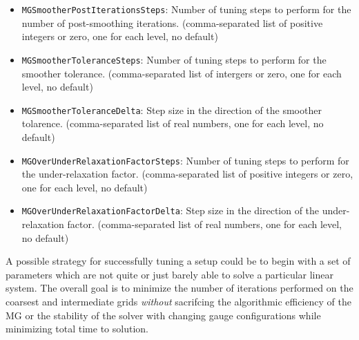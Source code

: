 \begin{itemize}
  \item \texttt{MGSmootherPostIterationsSteps}: Number of tuning steps to perform for the number of post-smoothing iterations. (comma-separated list of positive integers or zero, one for each level, no default)
  \item \texttt{MGSmootherToleranceSteps}: Number of tuning steps to perform for the smoother tolerance. (comma-separated list of intergers or zero, one for each level, no default)
  \item \texttt{MGSmootherToleranceDelta}: Step size in the direction of the smoother tolarence. (comma-separated list of real numbers, one for each level, no default)
  \item \texttt{MGOverUnderRelaxationFactorSteps}: Number of tuning steps to perform for the under-relaxation factor. (comma-separated list of positive integers or zero, one for each level, no default)
  \item \texttt{MGOverUnderRelaxationFactorDelta}: Step size in the direction of the under-relaxation factor. (comma-separated list of real numbers, one for each level, no default)
\end{itemize}

A possible strategy for successfully tuning a setup could be to begin with a set of parameters which are not quite or just barely able to solve a particular linear system.
The overall goal is to minimize the number of iterations performed on the coarsest and intermediate grids \emph{without} sacrifcing the algorithmic efficiency of the MG or the stability of the solver with changing gauge configurations while minimizing total time to solution.

